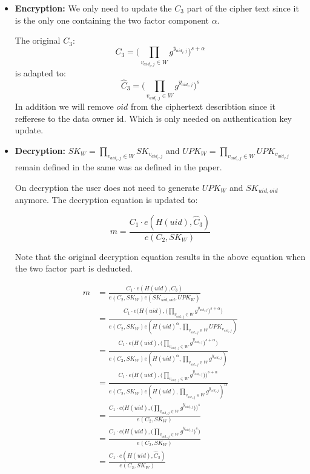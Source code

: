 \begin{itemize}
\item \textbf{Encryption:} 
We only need to update the $C_3$ part of the cipher text since it is the only one containing the two factor component $\alpha$.

The original $C_3$:
$$
C_3 = \Big( \prod_{v_{aid_{i}, j}\in W} g^{y_{aid_{i}, j}} \Big)^{s + \alpha} 
$$
is adapted to:
$$
\widehat{C}_3 = \Big( \prod_{v_{aid_{i}, j}\in W} g^{y_{aid_{i}, j}} \Big)^s
$$ 
In addition we will remove $oid$ from the ciphertext describtion since it refferese to the data owner id. Which is only needed on authentication key update.

\item \textbf{Decryption:}
$SK_W = \prod_{v_{aid_i,j} \in W} SK_{v_{aid_i,j}}$ and $UPK_W = \prod_{v_{aid_i,j} \in W} UPK_{v_{aid_i,j}}$ remain defined in the same was as defined in the paper. 

On decryption the user does not need to generate $UPK_W$ and $SK_{uid, oid}$ anymore. The decryption equation is updated to:

$$
m = \frac{C_1 \cdotp e(H(uid), \widehat{C}_3)}{e(C_2, SK_W)}
$$

Note that the original decryption equation results in the above equation when the two factor part is deducted.

\begin{equation}
\begin{split}
m &= \frac{C_1 \cdotp e(H(uid), C_3)}{e(C_2, SK_W)e(SK_{uid, oid}, UPK_W)} \\
  &= \frac{C_1 \cdotp e\Big(H(uid), \Big( \prod_{v_{aid_{i}, j}\in W} g^{y_{aid_{i}, j}} \Big)^{s + \alpha} \Big)}{e(C_2, SK_W)e(H(uid)^\alpha, \prod_{v_{aid_i,j} \in W} UPK_{v_{aid_i,j}})} \\
  &= \frac{C_1 \cdotp e\Big(H(uid), \Big( \prod_{v_{aid_{i}, j}\in W} g^{y_{aid_{i}, j}} \Big)^{s + \alpha} \Big)}{e(C_2, SK_W)e(H(uid)^\alpha, \prod_{v_{aid_i,j} \in W} g^{y_{aid_i,j}})} \\
  &= \frac{C_1 \cdotp e\Big(H(uid), \Big( \prod_{v_{aid_{i}, j}\in W} g^{y_{aid_{i}, j}} \Big) \Big)^{s + \alpha}}{e(C_2, SK_W)e(H(uid), \prod_{v_{aid_i,j} \in W} g^{y_{aid_i,j}})^\alpha} \\
  &= \frac{C_1 \cdotp e\Big(H(uid), \Big( \prod_{v_{aid_{i}, j}\in W} g^{y_{aid_{i}, j}} \Big) \Big)^{s}}{e(C_2, SK_W)} \\
  &= \frac{C_1 \cdotp e\Big(H(uid), \Big( \prod_{v_{aid_{i}, j}\in W} g^{y_{aid_{i}, j}} \Big)^{s} \Big)}{e(C_2, SK_W)} \\
  &= \frac{C_1 \cdotp e(H(uid), \widehat{C}_3)}{e(C_2, SK_W)}
\end{split}
\label{eq:2faRemoval}
\end{equation}


\end{itemize}
